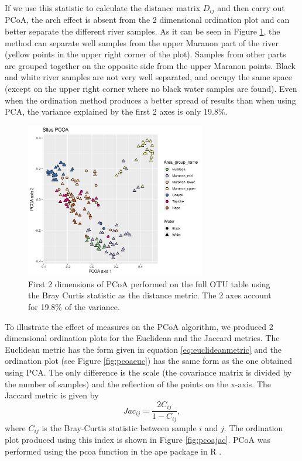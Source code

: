 If we use this statistic to calculate the distance matrix $D_{ij}$ and then carry out PCoA, the arch effect is absent from the 2 dimensional ordination plot and can better separate the different river samples. As it can be seen in Figure \ref{fig:pcoaotu12}, the method can separate well samples from the upper Maranon part of the river (yellow points in the upper right corner of the plot). Samples from other parts are grouped together on the opposite side from the upper Maranon points. Black and white river samples are not very well separated, and occupy the same space (except on the upper right corner where no black water samples are found). Even when the ordination method produces a better spread of results than when using PCA, the variance explained by the first 2 axes is only 19.8\%.


\begin{figure}[h]
\centering
\includegraphics[width = 0.7\textwidth]{pcoaotu12}
\caption{First 2 dimensions of PCoA performed on the full OTU table using the Bray Curtis statistic as the distance metric. The 2 axes account for 19.8\% of the variance.}
\label{fig:pcoaotu12}
\end{figure}

To illustrate the effect of measures on the PCoA algorithm, we produced 2 dimensional ordination plots for the Euclidean and the Jaccard metrics. The Euclidean metric has the form given in equation \eqref{eq:euclideanmetric} and the ordination plot (see Figure \ref{fig:pcoaeuc}) has the same form as the one obtained using PCA. The only difference is the scale (the covariance matrix is divided by the number of samples) and the reflection of the points on the x-axis. The Jaccard metric is given by
\begin{equation}
Jac_{ij} =\frac{2C_{ij}}{1-C_{ij}},
\end{equation} 
where $C_{ij}$ is the Bray-Curtis statistic between sample $i$ and $j$. The ordination plot produced using this index is shown in Figure \ref{fig:pcoajac}. PCoA was performed using the pcoa function in the ape package in R \cite{paradis_ape_nodate}.

